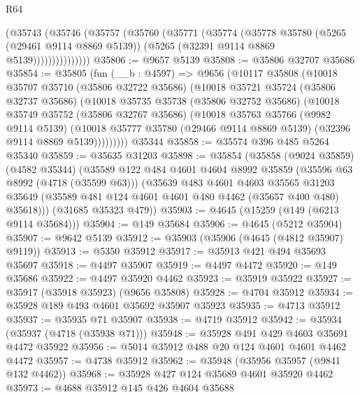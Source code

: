 \begin{lexlean}{R64}
\begin{coremodule}
                (@35743
                  (@35746
                    (@35757
                      (@35760
                        (@35771
                          (@35774
                            (@35778
                              @35780
                              (@5265 (@29461 @9114 @8869 @5139))
                              (@5265 (@32391 @9114 @8869 @5139)))))))))))))))
@35806 := @9657 @5139
@35808 := @35806 @32707 @35686
@35854 := @35805
    (fun (__b : @4597) =>
    @9656
      (@10117
        @35808
        (@10018
          @35707
          @35710
          (@35806 @32722 @35686)
          (@10018
            @35721
            @35724
            (@35806 @32737 @35686)
            (@10018
              @35735
              @35738
              (@35806 @32752 @35686)
              (@10018
                @35749
                @35752
                (@35806 @32767 @35686)
                (@10018
                  @35763
                  @35766
                  (@9982 @9114 @5139)
                  (@10018
                    @35777
                    @35780
                    (@29466 @9114 @8869 @5139)
                    (@32396 @9114 @8869 @5139)))))))))
    @35344
@35858 := @35574 @396 @485 @5264 @35340
@35859 := @35635 @31203
@35898 := @35854
    (@35858
      (@9024 @35859)
      (@4582 @35344)
      (@35589
        @122
        @484
        @4601
        @4604
        @8992
        @35859
        (@35596 @63 @8992 (@4718 (@35599 @63)))
        (@35639
          @483
          @4601
          @4603
          @35565
          @31203
          @35649
          (@35589 @481 @124 @4601 @4601 @480 @4462 (@35657 @400 @480) @35618)))
      (@31685 @35323 @479))
@35903 := @4645 (@15259 (@149 (@6213 @9114 @35684)))
@35904 := @149 @35684
@35906 := @4645 (@5212 @35904)
@35907 := @9642 @5139
@35912 := @35903 (@35906 (@4645 (@4812 @35907) @9119))
@35913 := @5350 @35912
@35917 := @35913 @421 @494 @35693 @35697
@35918 := @4497 @35907
@35919 := @4497 @4472
@35920 := @149 @35686
@35922 := @4497 @35920 @4462
@35923 := @35919 @35922
@35927 := @35917 (@35918 @35923) (@9656 @35808)
@35928 := @4704 @35912
@35934 := @35928 @189 @493 @4601 @35692 @35907 @35923
@35935 := @4713 @35912
@35937 := @35935 @71 @35907
@35938 := @4719 @35912
@35942 := @35934 (@35937 (@4718 (@35938 @71)))
@35948 := @35928 @491 @429 @4603 @35691 @4472 @35922
@35956 := @5014 @35912 @488 @20 @124 @4601 @4601 @4462 @4472
@35957 := @4738 @35912
@35962 := @35948 (@35956 @35957 (@9841 @132 @4462))
@35968 := @35928 @427 @124 @35689 @4601 @35920 @4462
@35973 := @4688 @35912 @145 @426 @4604 @35688

\end{coremodule}
\end{lexlean}
